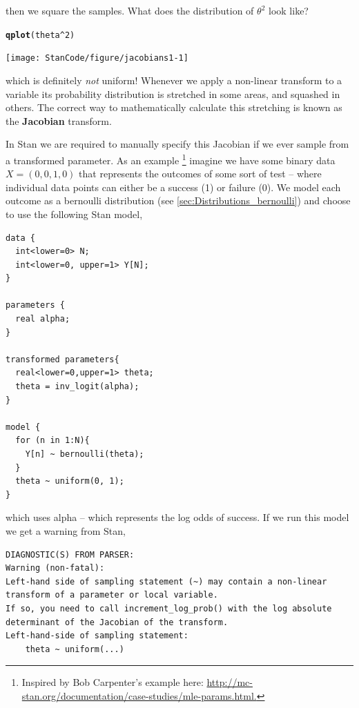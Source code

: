 \documentclass[11pt,fullpage]{book}
\makeatletter
\newenvironment{kframe}{%
	\def\at@end@of@kframe{}%
	\ifinner\ifhmode%
	\def\at@end@of@kframe{\end{minipage}}%
\begin{minipage}{\columnwidth}%
	\fi\fi%
	\def\FrameCommand##1{\hskip\@totalleftmargin \hskip-\fboxsep
		\colorbox{shadecolor}{##1}\hskip-\fboxsep
		\hskip-\linewidth \hskip-\@totalleftmargin \hskip\columnwidth}%
	\MakeFramed {\advance\hsize-\width
		\@totalleftmargin\z@ \linewidth\hsize
		\@setminipage}}%
{\par\unskip\endMakeFramed%
	\at@end@of@kframe}
\newcommand{\hlnum}[1]{\textcolor[rgb]{0.686,0.059,0.569}{#1}}%
\newcommand{\hlopt}[1]{\textcolor[rgb]{0,0,0}{#1}}%
\newcommand{\hlstd}[1]{\textcolor[rgb]{0.345,0.345,0.345}{#1}}%
\newcommand{\hlkwd}[1]{\textcolor[rgb]{0.737,0.353,0.396}{\textbf{#1}}}%
\newenvironment{knitrout}{}{} %
\makeatother
\begin{document}
then we square the samples. What does the distribution of $\theta^2$ look like?

\begin{knitrout}
\color{fgcolor}\begin{kframe}
\begin{alltt}
\hlkwd{qplot}\hlstd{(theta}\hlopt{^}\hlnum{2}\hlstd{)}
\end{alltt}
\end{kframe}
\texttt{[image: StanCode/figure/jacobians1-1]} 
\end{knitrout}

which is definitely \textit{not} uniform! Whenever we apply a non-linear transform to a variable its probability distribution is stretched in some areas, and squashed in others. The correct way to mathematically calculate this stretching is known as the \textbf{Jacobian} transform. 

In Stan we are required to manually specify this Jacobian if we ever sample from a transformed parameter. As an example \cite{carpenter2016stan}\footnote{Inspired by Bob Carpenter's example here: \url{http://mc-stan.org/documentation/case-studies/mle-params.html.}} imagine we have some binary data $X=(0,0,1,0)$ that represents the outcomes of some sort of test -- where individual data points can either be a success (1) or failure (0). We model each outcome as a bernoulli distribution (see \ref{sec:Distributions_bernoulli}) and choose to use the following Stan model,

\begin{verbatim}
data { 
  int<lower=0> N; 
  int<lower=0, upper=1> Y[N]; 
} 

parameters { 
  real alpha; 
} 

transformed parameters{
  real<lower=0,upper=1> theta;
  theta = inv_logit(alpha);
}

model { 
  for (n in 1:N){
    Y[n] ~ bernoulli(theta); 
  }
  theta ~ uniform(0, 1);  
} 
\end{verbatim}
which uses alpha -- which represents the log odds of success. If we run this model we get a warning from Stan,


\begin{knitrout}\small
		\color{fgcolor}\begin{kframe}
			\begin{verbatim}
DIAGNOSTIC(S) FROM PARSER:
Warning (non-fatal):
Left-hand side of sampling statement (~) may contain a non-linear 
transform of a parameter or local variable.
If so, you need to call increment_log_prob() with the log absolute 
determinant of the Jacobian of the transform.
Left-hand-side of sampling statement:
    theta ~ uniform(...)
			\end{verbatim}
		\end{kframe}
	\end{knitrout}
\end{document}
